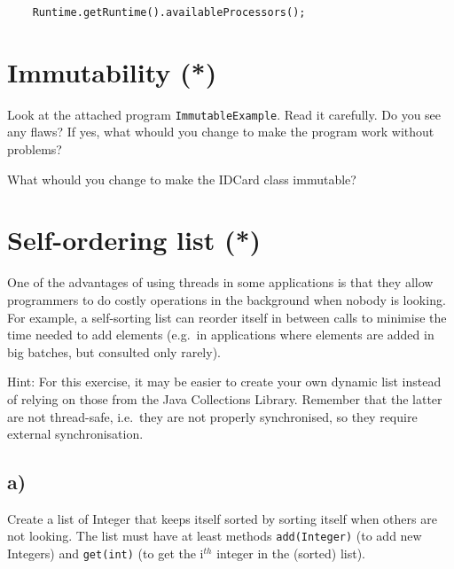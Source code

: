 \documentclass{article}
\begin{document}
\begin{verbatim}
    Runtime.getRuntime().availableProcessors();
\end{verbatim}

\section{Immutability (*)}
\label{sec:immutability}

Look at the attached program \verb+ImmutableExample+. Read it
carefully. Do you see any flaws? If yes, what whould you change to
make the program work without problems?

What whould you change to make the IDCard class immutable?

\section{Self-ordering list (*)}
\label{sec:self-ordering-list}

One of the advantages of using threads in some applications is that
they allow programmers to do costly operations in the background when
nobody is looking. For example, a self-sorting list can reorder itself
in between calls to minimise the time needed to add elements (e.g.~in
applications where elements are added in big batches, but consulted
only rarely).

Hint: For this exercise, it may be easier to create your own dynamic
list instead of relying on those from the Java Collections
Library. Remember that the latter are not thread-safe, i.e.~they are
not properly synchronised, so they require external synchronisation. 

\subsection{a)}

Create a list of Integer that keeps itself sorted by sorting itself
when others are not looking. The list must have at least methods
\verb+add(Integer)+ (to add new Integers) and \verb+get(int)+ (to get
the i$^{th}$ integer in the (sorted) list). 
\end{document}
